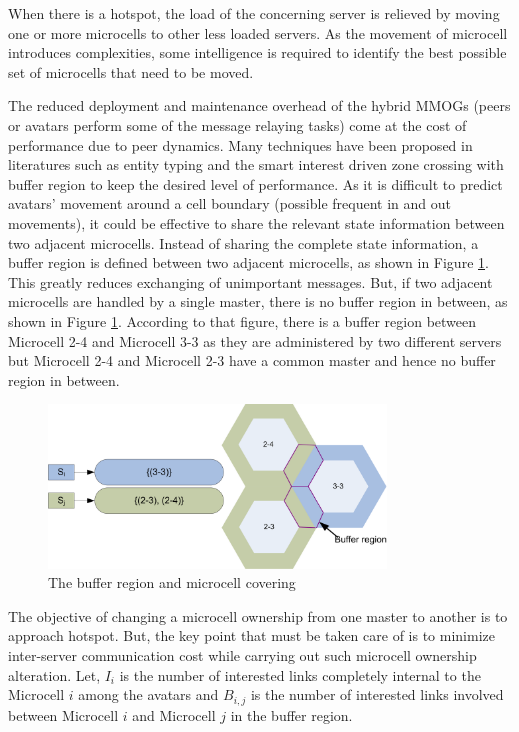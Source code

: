 When there is a hotspot, the load of the concerning server is relieved by moving one or more microcells to other less loaded servers. As the movement of microcell introduces complexities, some intelligence is required to identify the best possible set of microcells that need to be moved.

The reduced deployment and maintenance overhead of the hybrid MMOGs (peers or avatars perform some of the message relaying tasks) come at the cost of performance due to peer dynamics. Many techniques have been proposed in literatures such as entity typing and the smart interest driven zone crossing with buffer region to keep the desired level of performance. As it is difficult to predict avatars' movement around a cell boundary (possible frequent in and out movements), it could be effective to share the relevant state information between two adjacent microcells. Instead of sharing the complete state information, a buffer region is defined between two adjacent microcells, as shown in Figure \ref{fig:ahmedbufferregion}. This greatly reduces exchanging of unimportant messages. But, if two adjacent microcells are handled by a single master, there is no buffer region in between, as shown in Figure \ref{fig:ahmedbufferregion}. According to that figure, there is a buffer region between Microcell 2-4 and Microcell 3-3 as they are administered by two different servers but Microcell 2-4 and Microcell 2-3 have a common master and hence no buffer region in between.

\begin{figure}
 \centering
 \includegraphics[width=0.8\textwidth]{images/ahmedbufferregion}
 \caption{The buffer region and microcell covering}
 \label{fig:ahmedbufferregion}
\end{figure}

The objective of changing a microcell ownership from one master to another is to approach hotspot. But, the key point that must be taken care of is to minimize inter-server communication cost while carrying out such microcell ownership alteration. Let, $I_i$ is the number of interested links completely internal to the Microcell $i$ among the avatars and $B_{i,j}$ is the number of interested links involved between Microcell $i$ and Microcell $j$ in the buffer region.

